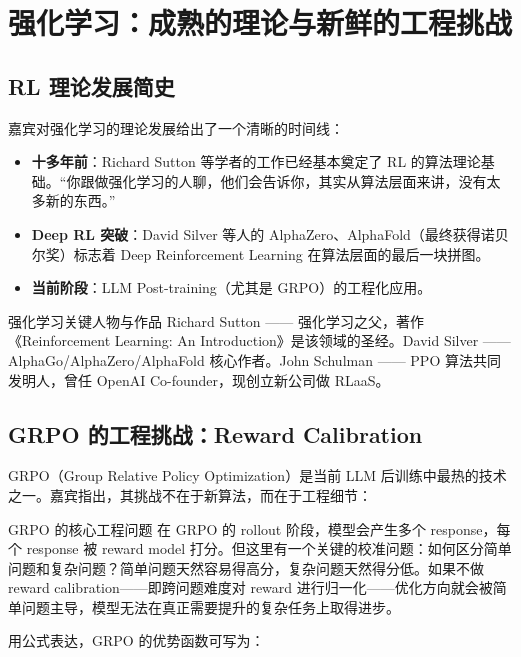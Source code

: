 
\section{强化学习：成熟的理论与新鲜的工程挑战}

\subsection{RL 理论发展简史}

嘉宾对强化学习的理论发展给出了一个清晰的时间线：

\begin{itemize}
    \item \textbf{十多年前}：Richard Sutton 等学者的工作已经基本奠定了 RL 的算法理论基础。``你跟做强化学习的人聊，他们会告诉你，其实从算法层面来讲，没有太多新的东西。''
    \item \textbf{Deep RL 突破}：David Silver 等人的 AlphaZero、AlphaFold（最终获得诺贝尔奖）标志着 Deep Reinforcement Learning 在算法层面的最后一块拼图。
    \item \textbf{当前阶段}：LLM Post-training（尤其是 GRPO）的工程化应用。
\end{itemize}

\begin{knowledgebox}{强化学习关键人物与作品}
Richard Sutton —— 强化学习之父，著作《Reinforcement Learning: An Introduction》是该领域的圣经。David Silver —— AlphaGo/AlphaZero/AlphaFold 核心作者。John Schulman —— PPO 算法共同发明人，曾任 OpenAI Co-founder，现创立新公司做 RLaaS。
\end{knowledgebox}

\subsection{GRPO 的工程挑战：Reward Calibration}

GRPO（Group Relative Policy Optimization）是当前 LLM 后训练中最热的技术之一。嘉宾指出，其挑战不在于新算法，而在于工程细节：

\begin{importantbox}{GRPO 的核心工程问题}
在 GRPO 的 rollout 阶段，模型会产生多个 response，每个 response 被 reward model 打分。但这里有一个关键的校准问题：如何区分简单问题和复杂问题？简单问题天然容易得高分，复杂问题天然得分低。如果不做 reward calibration——即跨问题难度对 reward 进行归一化——优化方向就会被简单问题主导，模型无法在真正需要提升的复杂任务上取得进步。
\end{importantbox}

用公式表达，GRPO 的优势函数可写为：


